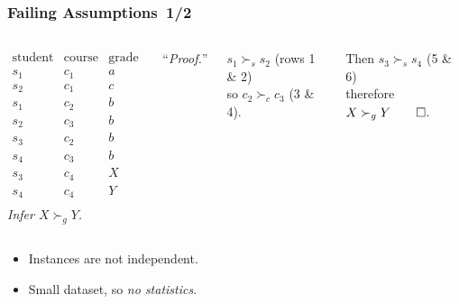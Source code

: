 \documentclass[bigger]{beamer}
\begin{document}
\begin{frame}
    \frametitle{Failing Assumptions\hfill~1/2}
    \vfill
    \begin{columns}[c]
        $$
            \begin{array}{ccc}
                \text{student} & \text{course} & \text{grade} \\
                \hline
                s_1            & c_1           & a            \\
                s_2            & c_1           & c            \\
                s_1            & c_2           & b            \\
                s_2            & c_3           & b            \\
                s_3            & c_2           & b            \\
                s_4            & c_3           & b            \\
                s_3            & c_4           & X            \\
                s_4            & c_4           & Y            \\
            \end{array}
        $$
        \emph{Infer $X \succ_g Y$.}

        \bigskip
        ``\emph{Proof.}'' 

            \bigskip
            $s_1 \succ_s s_2$ (rows 1 \& 2)\\ so $c_2 \succ_c c_3$ (3 \& 4). 
            
            \bigskip
            Then $s_3 \succ_s s_4$ (5 \& 6)\\ therefore $X \succ_g Y\qed$.
    \end{columns}
    \vfill
    \begin{itemize}
        \item Instances are not independent.
        \item Small dataset, so \emph{no statistics}.
    \end{itemize}
\end{frame}
%
\end{document}
